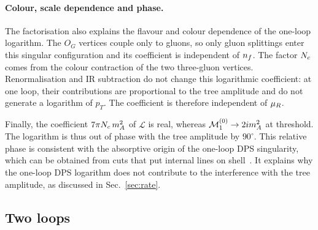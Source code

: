 \paragraph{Colour, scale dependence and phase.}

The factorisation also explains the flavour
and colour dependence of the one-loop
logarithm. The $O_G$ vertices couple only
to gluons, so only gluon splittings enter this
singular configuration and its coefficient is
independent of $n_f$. The factor $N_c$
comes from the colour contraction of
the two three-gluon vertices.
Renormalisation and IR subtraction
do not change this logarithmic coefficient:
at one loop, their contributions are
proportional to the tree amplitude and
do not generate a logarithm of $p_T$.
The coefficient is therefore independent
of $\mu_R$.

Finally, the coefficient
$7\pi N_c\,m_A^2$ of $\mathcal L$ is
real, whereas
$\mathcal M_1^{(0)}\to2im_A^2$
at threshold. The logarithm is thus
out of phase with the tree amplitude
by $90^\circ$.
This relative phase is consistent
with the absorptive origin of the
one-loop DPS singularity, which can
be obtained from cuts that put
internal lines on
shell~\cite{GauntStirling2011}.
It explains why the one-loop DPS
logarithm does not contribute to
the interference with the tree
amplitude, as discussed in
Sec.~\ref{sec:rate}.

\subsection{Two loops}
\label{sec:two-loop}

